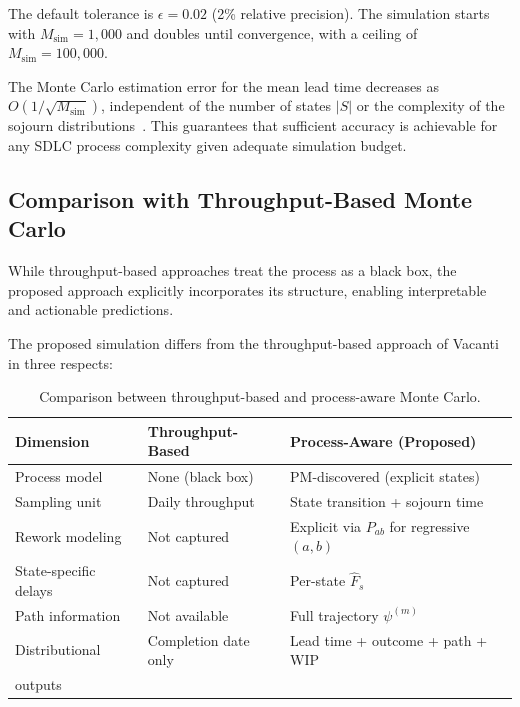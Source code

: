 The default tolerance is $\epsilon = 0.02$ (2\% relative precision). 
The simulation starts with $M_{\text{sim}} = 1{,}000$ and doubles until 
convergence, with a ceiling of $M_{\text{sim}} = 100{,}000$.

\begin{property}
\label{prop:convergence-rate}
The Monte Carlo estimation error for the mean lead time decreases as 
$O(1 / \sqrt{M_{\text{sim}}})$, independent of the number of states 
$|S|$ or the complexity of the sojourn 
distributions~\cite{robert2004monte}. This guarantees that sufficient 
accuracy is achievable for any SDLC process complexity given adequate 
simulation budget.
\end{property}


\subsection{Comparison with Throughput-Based Monte Carlo}
\label{sec:s4-comparison}

While throughput-based approaches treat the process as a black box, the proposed approach explicitly incorporates its structure, enabling interpretable and actionable predictions.


The proposed simulation differs from the throughput-based approach 
of Vacanti~\cite{vacanti2015} in three respects:

\begin{table}[htbp]
\centering
\caption{Comparison between throughput-based and process-aware Monte Carlo.}
\label{tab:mc-comparison}
\begin{tabular}{lll}
\toprule
\textbf{Dimension} & \textbf{Throughput-Based} & \textbf{Process-Aware (Proposed)} \\
\midrule
Process model & None (black box) & PM-discovered (explicit states) \\
Sampling unit & Daily throughput & State transition + sojourn time \\
Rework modeling & Not captured & Explicit via $P_{ab}$ for regressive $(a,b)$ \\
State-specific delays & Not captured & Per-state $\hat{F}_s$ \\
Path information & Not available & Full trajectory $\psi^{(m)}$ \\
Distributional & Completion date only & Lead time + outcome + path + WIP \\
\quad outputs & & \\
\bottomrule
\end{tabular}
\end{table}

